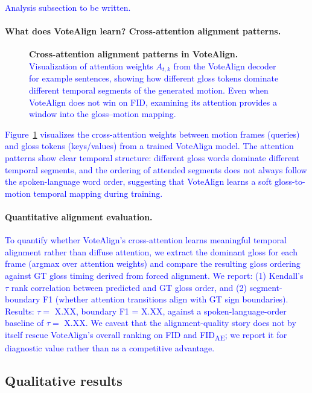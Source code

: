 \documentclass{article}
\newcommand{\placeholder}[1]{\textcolor{blue}{#1}}
\begin{document}
\placeholder{Analysis subsection to be written.}

\paragraph{What does VoteAlign learn? Cross-attention alignment patterns.}

\begin{figure}[t]
    \centering
    \fbox{\rule[-.5cm]{0cm}{4cm} \rule[-.5cm]{13cm}{0cm}}
    \caption{\textbf{Cross-attention alignment patterns in VoteAlign.}
    \placeholder{Visualization of attention weights $A_{t,k}$ from the VoteAlign decoder for example sentences, showing how different gloss tokens dominate different temporal segments of the generated motion. Even when VoteAlign does not win on FID, examining its attention provides a window into the gloss--motion mapping.}}
    \label{fig:attention}
\end{figure}

\placeholder{Figure~\ref{fig:attention} visualizes the cross-attention weights between motion frames (queries) and gloss tokens (keys/values) from a trained VoteAlign model. The attention patterns show clear temporal structure: different gloss words dominate different temporal segments, and the ordering of attended segments does not always follow the spoken-language word order, suggesting that VoteAlign learns a soft gloss-to-motion temporal mapping during training.}

\paragraph{Quantitative alignment evaluation.}
\placeholder{To quantify whether VoteAlign's cross-attention learns meaningful temporal alignment rather than diffuse attention, we extract the dominant gloss for each frame (argmax over attention weights) and compare the resulting gloss ordering against GT gloss timing derived from forced alignment.
We report: (1) Kendall's $\tau$ rank correlation between predicted and GT gloss order, and (2) segment-boundary F1 (whether attention transitions align with GT sign boundaries).
Results: $\tau = $ X.XX, boundary F1 = X.XX, against a spoken-language-order baseline of $\tau = $ X.XX. We caveat that the alignment-quality story does not by itself rescue VoteAlign's overall ranking on FID and FID\textsubscript{AE}; we report it for diagnostic value rather than as a competitive advantage.}

\subsection{Qualitative results}
\end{document}
